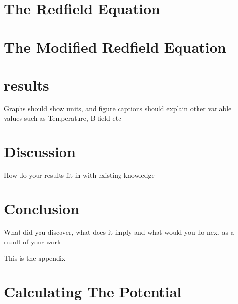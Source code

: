 \documentclass{article}
\begin{document}
\section{The Redfield Equation}


\section{The Modified Redfield Equation}



\section{results}
Graphs should show units, and figure captions should explain other variable values such as Temperature, B
field etc

\section{Discussion}
How do your results fit in with existing knowledge

\section{Conclusion}
What did you discover, what does it imply and what would you do next as a result of your work

\printbibliography{}

\begin{appendix}
    This is the appendix
    \section{Calculating The Potential}\label{app:interaction potential calculation}
    
\end{appendix}
\end{document}
